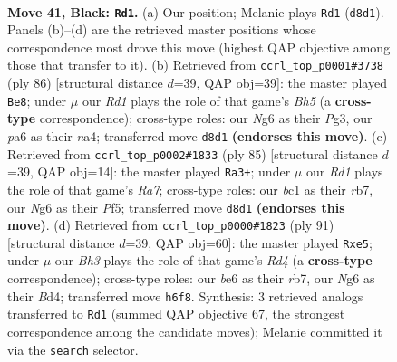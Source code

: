 \documentclass[11pt]{article}
\begin{document}
\clearpage

\begin{figure}[p]\centering
\begin{subfigure}{0.46\textwidth}\centering
\resizebox{\linewidth}{!}{%
\newchessgame
\chessboard[
  setfen={3r4/p6k/Pp2B1nb/5p2/4pP2/6K1/8/1RB5 b - - 15 41},
  showmover=false,
  pgfstyle=straightmove, color=movearrow, markmove={d8-d1}
]}
\caption{}
\end{subfigure}\hfill
\begin{subfigure}{0.46\textwidth}\centering
\resizebox{\linewidth}{!}{%
\newchessgame
\chessboard[
  setfen={8/N3b1k1/3p4/3Pp2B/n1P5/3b2P1/7K/B7 w - - 1 44},
  showmover=false,
  pgfstyle=straightmove, color=movearrow, markmove={h5-e8}
]}
\caption{}
\end{subfigure}
\\[4pt]
\begin{subfigure}{0.46\textwidth}\centering
\resizebox{\linewidth}{!}{%
\newchessgame
\chessboard[
  setfen={8/1R6/3bk2p/5pp1/8/3KB2P/r4PP1/8 b - - 1 43},
  showmover=false,
  pgfstyle=straightmove, color=movearrow, markmove={a2-a3}
]}
\caption{}
\end{subfigure}\hfill
\begin{subfigure}{0.46\textwidth}\centering
\resizebox{\linewidth}{!}{%
\newchessgame
\chessboard[
  setfen={5k2/1R3p2/4p3/3rP2B/3b1p2/1P5K/6P1/8 b - - 1 46},
  showmover=false,
  pgfstyle=straightmove, color=movearrow, markmove={d5-e5}
]}
\caption{}
\end{subfigure}
\caption{\textbf{Move 41, Black: \texttt{Rd1}.} (a) Our position; Melanie plays \texttt{Rd1} (\texttt{d8d1}). Panels (b)--(d) are the retrieved master positions whose correspondence most drove this move (highest QAP objective among those that transfer to it). (b) Retrieved from \texttt{ccrl\_top\_p0001\#3738} (ply 86) [structural distance $d$=39, QAP obj=39]: the master played \texttt{Be8}; under $\mu$ our \emph{Rd1} plays the role of that game's \emph{Bh5} (a \textbf{cross-type} correspondence); cross-type roles: our \emph{N}g6 as their \emph{P}g3, our \emph{p}a6 as their \emph{n}a4; transferred move \texttt{d8d1} \textbf{(endorses this move)}. (c) Retrieved from \texttt{ccrl\_top\_p0002\#1833} (ply 85) [structural distance $d$=39, QAP obj=14]: the master played \texttt{Ra3+}; under $\mu$ our \emph{Rd1} plays the role of that game's \emph{Ra7}; cross-type roles: our \emph{b}c1 as their \emph{r}b7, our \emph{N}g6 as their \emph{P}f5; transferred move \texttt{d8d1} \textbf{(endorses this move)}. (d) Retrieved from \texttt{ccrl\_top\_p0000\#1823} (ply 91) [structural distance $d$=39, QAP obj=60]: the master played \texttt{Rxe5}; under $\mu$ our \emph{Bh3} plays the role of that game's \emph{Rd4} (a \textbf{cross-type} correspondence); cross-type roles: our \emph{b}e6 as their \emph{r}b7, our \emph{N}g6 as their \emph{B}d4; transferred move \texttt{h6f8}. Synthesis: 3 retrieved analogs transferred to \texttt{Rd1} (summed QAP objective 67, the strongest correspondence among the candidate moves); Melanie committed it via the \texttt{search} selector.}
\label{fig:thought-m81}
\end{figure}
\end{document}
